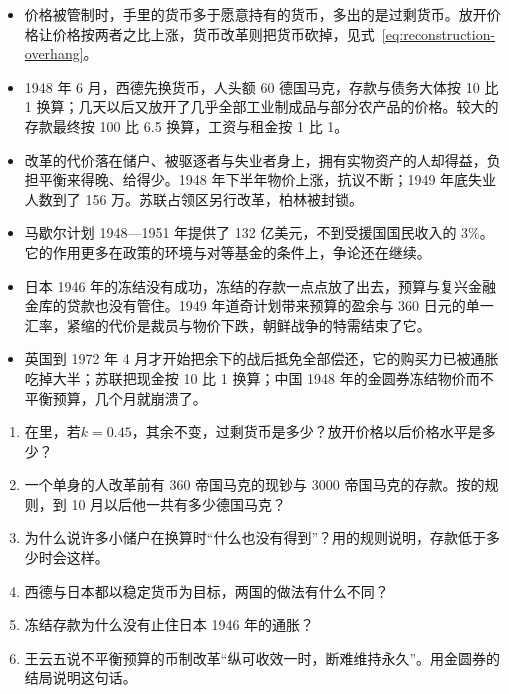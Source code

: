 \begin{takeaways}
\begin{itemize}
\item 价格被管制时，手里的货币多于愿意持有的货币，多出的是过剩货币。放开价格让价格按两者之比上涨，货币改革则把货币砍掉，见式~\eqref{eq:reconstruction-overhang}。
\item 1948 年 6 月，西德先换货币，人头额 60 德国马克，存款与债务大体按 10 比 1 换算；几天以后又放开了几乎全部工业制成品与部分农产品的价格。较大的存款最终按 100 比 6.5 换算，工资与租金按 1 比 1。
\item 改革的代价落在储户、被驱逐者与失业者身上，拥有实物资产的人却得益，负担平衡来得晚、给得少。1948 年下半年物价上涨，抗议不断；1949 年底失业人数到了 156 万。苏联占领区另行改革，柏林被封锁。
\item 马歇尔计划 1948—1951 年提供了 132 亿美元，不到受援国国民收入的 3\%。它的作用更多在政策的环境与对等基金的条件上，争论还在继续。
\item 日本 1946 年的冻结没有成功，冻结的存款一点点放了出去，预算与复兴金融金库的贷款也没有管住。1949 年道奇计划带来预算的盈余与 360 日元的单一汇率，紧缩的代价是裁员与物价下跌，朝鲜战争的特需结束了它。
\item 英国到 1972 年 4 月才开始把余下的战后抵免全部偿还，它的购买力已被通胀吃掉大半；苏联把现金按 10 比 1 换算；中国 1948 年的金圆券冻结物价而不平衡预算，几个月就崩溃了。
\end{itemize}
\end{takeaways}

\begin{selfcheck}
\begin{enumerate}
\item 在里，若$k=0.45$，其余不变，过剩货币是多少？放开价格以后价格水平是多少？
\item 一个单身的人改革前有 360 帝国马克的现钞与 3000 帝国马克的存款。按的规则，到 10 月以后他一共有多少德国马克？
\item 为什么说许多小储户在换算时“什么也没有得到”？用的规则说明，存款低于多少时会这样。
\item 西德与日本都以稳定货币为目标，两国的做法有什么不同？
\item 冻结存款为什么没有止住日本 1946 年的通胀？
\item 王云五说不平衡预算的币制改革“纵可收效一时，断难维持永久”。用金圆券的结局说明这句话。
\end{enumerate}
\end{selfcheck}


